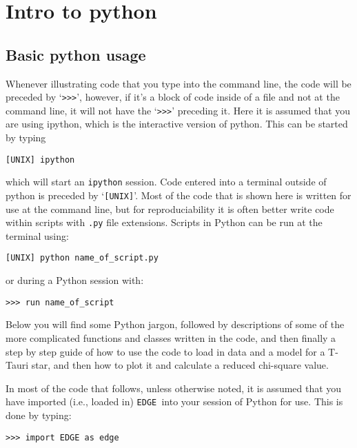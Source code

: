 \documentclass{article}
\newcommand{\edge}{\texttt{EDGE }}
\begin{document}
\section{Intro to python} \label{introtopython}
\subsection{Basic python usage} 
Whenever illustrating code that you type into the command line, the code will be preceded by `\texttt{>>>}', however, if it’s a block of code inside of a file and not at the command line, it will not have the `\texttt{>>>}' preceding it. Here it is assumed that you are using ipython, which is the interactive version of python. This can be started by typing

\vspace{2mm}
\texttt{[UNIX] ipython}
\vspace{2mm}

\noindent which will start an \texttt{ipython} session. Code entered into a terminal outside of python is preceded by `\texttt{[UNIX]}'. Most of the code that is shown here is written for use at the command line, but for reproduciability it is often better write code within scripts with \texttt{.py} file extensions. Scripts in Python can be run at the terminal using:

\vspace{2mm}
\texttt{[UNIX] python name\_of\_script.py}
\vspace{2mm}

or during a Python session with:

\vspace{2mm}
\texttt{>>> run name\_of\_script}
\vspace{2mm}

\noindent Below you will find some Python jargon, followed by descriptions of some of the more complicated functions and classes written in the code, and then finally a step by step guide of how to use the code to load in data and a model for a T-Tauri star, and then how to plot it and calculate a reduced chi-square value.

\vspace{2mm}

\noindent In most of the code that follows, unless otherwise noted, it is assumed that you have imported (i.e., loaded in) \edge into your session of Python for use. This is done by typing:

\vspace{2mm}
\texttt{>>> import EDGE as edge}
\vspace{2mm}
\end{document}
